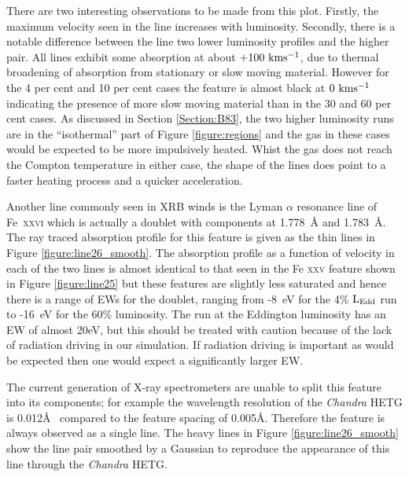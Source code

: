 \documentclass[a4paper,fleqn,usenatbib]{mnras}
\begin{document}
There are two interesting observations to be made from this plot. Firstly, the maximum velocity seen in 
the line increases with luminosity. Secondly, there is a notable difference between the line two lower luminosity 
profiles and the higher pair. All lines exhibit some absorption at about $\rm{+100~kms^{-1}}$, due to thermal 
broadening of absorption from stationary or slow moving material. However for the 4 per cent and 10 per cent 
cases the feature is almost black at $\rm{0~kms^{-1}}$ indicating the presence of more slow moving material than 
in the 30 and 60 per cent cases. As discussed in Section \ref{Section:B83}, the two higher luminosity runs
are in the ``isothermal'' part of Figure \ref{figure:regions} and the gas in these cases would be expected to 
be more impulsively heated. Whist the gas does not reach the Compton temperature in either case, the 
shape of the lines does point to a faster heating process and a quicker acceleration. 


Another line commonly seen in XRB winds is the Lyman $\alpha$ resonance 
line of Fe~\textsc{xxvi} which is actually a doublet with components at
1.778~{\AA} and 1.783~{\AA}. The ray traced absorption profile for this 
feature is given as the thin lines in Figure \ref{figure:line26_smooth}. The absorption profile
as a function of velocity in each of the two lines is almost identical to that seen in the 
Fe \textsc{xxv} feature shown in Figure \ref{figure:line25} but these features
are slightly less
saturated and hence there is a range of EWs for the doublet, ranging from -8~eV for the 4\% $\rm{L_{Edd}}$
run to -16~eV for the 60\% luminosity. The run at the Eddington luminosity 
has an EW of almost 20eV, but this should be treated with caution because of the lack
of radiation driving in our simulation. If radiation driving is important as would be expected then one would expect
a significantly larger EW.

The current generation of X-ray spectrometers are unable to split this feature
into its components; for example the wavelength resolution of the \emph{Chandra}
HETG is 0.012\AA~ compared to the feature spacing of 0.005\AA.
 Therefore the feature is always observed as a single line. The heavy lines in Figure 
 \ref{figure:line26_smooth}
show the line pair smoothed by a Gaussian to reproduce the appearance of this line
through the \emph{Chandra} HETG. 
\end{document}
